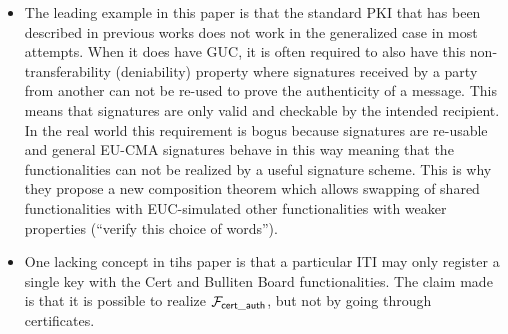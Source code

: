 \begin{itemize}
	\item The leading example in this paper is that the standard PKI that has been described in previous works does not work in the generalized case in most attempts.
			When it does have GUC, it is often required to also have this non-transferability (deniability) property where signatures received by a party from another can not be re-used to prove the authenticity of a message.
			This means that signatures are only valid and checkable by the intended recipient. 
			In the real world this requirement is bogus because signatures are re-usable and general EU-CMA signatures behave in this way meaning that the functionalities can not be realized by a useful signature scheme.
			This is why they propose a new composition theorem which allows swapping of shared functionalities with EUC-simulated other functionalities with weaker properties (``verify this choice of words'').
	\item One lacking concept in tihs paper is that a particular ITI may only register a single key with the Cert and Bulliten Board functionalities.
			The claim made is that it is possible to realize $\mathcal{F}_{{\mathsf {cert\_auth}}}$, but not by going through certificates.
\end{itemize}


